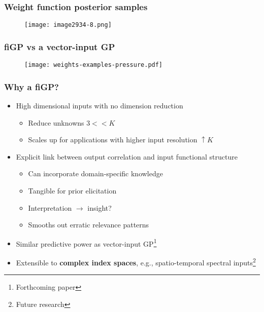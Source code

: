 \documentclass[aspectratio=169,t,xcolor=table]{beamer}
\begin{document}
\begin{frame}
  \frametitle{Weight function posterior samples}

  \begin{figure}
    \centering
    \texttt{[image: image2934-8.png]}
  \end{figure}
\end{frame}



\begin{frame}
  \frametitle{fiGP vs a vector-input GP}

  \begin{figure}
    \centering
    \texttt{[image: weights-examples-pressure.pdf]}
  \end{figure}
\end{frame}

\begin{frame}
  \frametitle{Why a fiGP?}
  \begin{itemize}
  \item[+]<1-> High dimensional inputs with no dimension reduction
    \begin{itemize}
    \item Reduce unknowns $3 << K$
    \item Scales up for applications with higher input resolution
      $\uparrow K$
    \end{itemize}
  \item[+]<2-> Explicit link between output correlation and
    input functional structure
    \begin{itemize}
    \item<2-> Can incorporate domain-specific knowledge
    \item<2-> Tangible for prior elicitation
    \item<2-> Interpretation $\to$ insight?
    \item<2-> Smooths out erratic relevance patterns
    \end{itemize}
  \item[+]<3-> Similar predictive power as vector-input
    GP\footnote{Forthcoming paper}
  \item[++]<4-> Extensible to \alert{\textbf{complex
index spaces}}, e.g., spatio-temporal spectral inputs\footnote{Future research}
  \end{itemize}
\end{frame}
\end{document}

